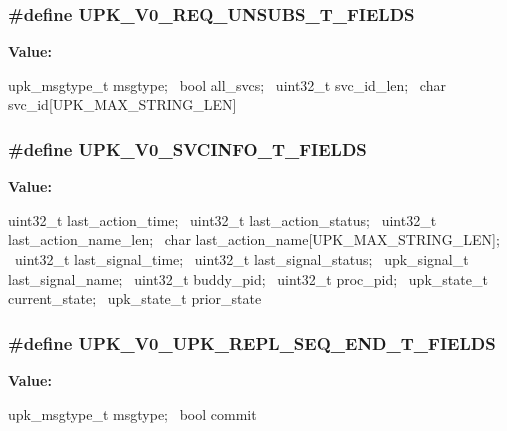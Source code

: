 \subsubsection[{UPK\_\-V0\_\-REQ\_\-UNSUBS\_\-T\_\-FIELDS}]{\setlength{\rightskip}{0pt plus 5cm}\#define UPK\_\-V0\_\-REQ\_\-UNSUBS\_\-T\_\-FIELDS}\label{upk__v0__protocol__structs_8h_a2b6288d2c66ef74a6650ef44cc044189}
{\bfseries Value:}
\begin{DoxyCode}
upk_msgtype_t       msgtype; \
    bool                all_svcs; \
    uint32_t            svc_id_len; \
    char                svc_id[UPK_MAX_STRING_LEN]
\end{DoxyCode}
\subsubsection[{UPK\_\-V0\_\-SVCINFO\_\-T\_\-FIELDS}]{\setlength{\rightskip}{0pt plus 5cm}\#define UPK\_\-V0\_\-SVCINFO\_\-T\_\-FIELDS}\label{upk__v0__protocol__structs_8h_acccca258049c0a041c3e20291266bc79}
{\bfseries Value:}
\begin{DoxyCode}
uint32_t                last_action_time; \
    uint32_t                last_action_status; \
    uint32_t                last_action_name_len; \
    char                    last_action_name[UPK_MAX_STRING_LEN]; \
    uint32_t                last_signal_time; \
    uint32_t                last_signal_status; \
    upk_signal_t            last_signal_name; \
    uint32_t                buddy_pid; \
    uint32_t                proc_pid; \
    upk_state_t             current_state; \
    upk_state_t             prior_state
\end{DoxyCode}
\subsubsection[{UPK\_\-V0\_\-UPK\_\-REPL\_\-SEQ\_\-END\_\-T\_\-FIELDS}]{\setlength{\rightskip}{0pt plus 5cm}\#define UPK\_\-V0\_\-UPK\_\-REPL\_\-SEQ\_\-END\_\-T\_\-FIELDS}\label{upk__v0__protocol__structs_8h_a3ed27dd7d93ecf5d795930425868cb19}
{\bfseries Value:}
\begin{DoxyCode}
upk_msgtype_t      msgtype; \
    bool                    commit
\end{DoxyCode}

